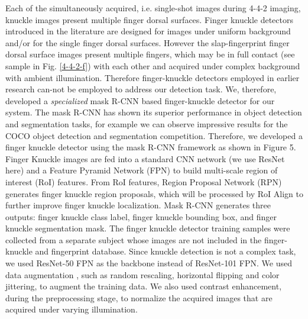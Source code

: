 Each of the simultaneously acquired, i.e. single-shot images during 4-4-2 imaging, knuckle images present multiple finger dorsal surfaces. Finger knuckle detectors introduced in the literature \cite{jaswal2016knuckle} are designed for images under uniform background and/or for the single finger dorsal surfaces. However the slap-fingerprint finger dorsal surface images present multiple fingers, which may be in full contact (see sample in Fig. \ref{4-4-2-f}) with each other and acquired under complex background with ambient illumination. Therefore finger-knuckle detectors employed in earlier research \cite{kumar2009personal} can-not be employed to address our detection task. We, therefore, developed a \textit{specialized} mask R-CNN \cite{he2017mask} based finger-knuckle detector for our system. The mask R-CNN \cite{he2017mask} has shown its superior performance in object detection and segmentation tasks, for example we can observe impressive results for the COCO object detection and segmentation competition. Therefore, we developed a finger knuckle detector using the mask R-CNN framework as shown in Figure 5. Finger Knuckle images are fed into a standard CNN network (we use ResNet \cite{he2016deep} here) and a Feature Pyramid Network (FPN) \cite{lin2017feature} to build multi-scale region of interest (RoI) features. From RoI features, Region Proposal Network (RPN) generates finger knuckle region proposals, which will be processed by RoI Align to further improve finger knuckle localization. Mask R-CNN generates three outputs: finger knuckle class label, finger knuckle bounding box, and finger knuckle segmentation mask. The finger knuckle detector training samples were collected from a separate subject whose images are not included in the finger-knuckle and fingerprint database. Since knuckle detection is not a complex task, we used ResNet-50 FPN as the backbone instead of ResNet-101 FPN. We used data augmentation \cite{data-augmentation}, such as random rescaling, horizontal flipping and color jittering, to augment the training data. We also used contrast enhancement, during the preprocessing stage, to normalize the acquired images that are acquired under varying illumination.  

